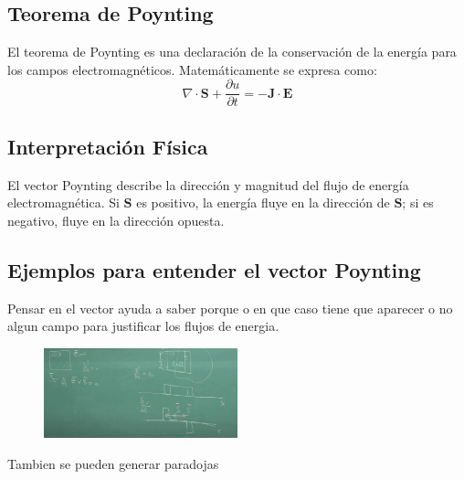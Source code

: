 \documentclass{article}
\begin{document}
	\subsection{Teorema de Poynting}
	El teorema de Poynting es una declaración de la conservación de la energía para los campos electromagnéticos. Matemáticamente se expresa como:
	\begin{equation}
		\nabla \cdot \mathbf{S} + \frac{\partial u}{\partial t} = -\mathbf{J} \cdot \mathbf{E}
	\end{equation}
	
	\subsection{Interpretación Física}
	El vector Poynting describe la dirección y magnitud del flujo de energía electromagnética. Si \(\mathbf{S}\) es positivo, la energía fluye en la dirección de \(\mathbf{S}\); si es negativo, fluye en la dirección opuesta.
	
	\subsection{Ejemplos para entender el vector Poynting}
	Pensar en el vector ayuda a saber porque o en que caso tiene que aparecer o no algun campo para justificar los flujos de energia.
	
	\begin{figure}[h]
		\centering
		\includegraphics[width=0.5\textwidth]{imagen2.jpg}
		\label{fig:mi_imagen3}
	\end{figure}
	Tambien se pueden generar paradojas
	
\end{document}
